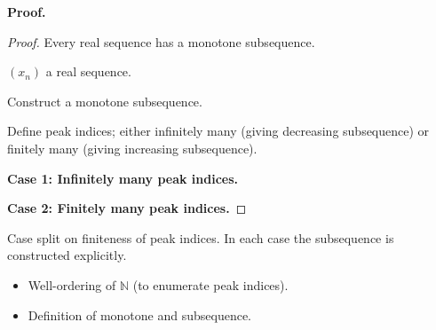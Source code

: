 \noindent
\textbf{Proof.}
\begin{proof}
\Claim Every real sequence has a monotone subsequence.

\Given $(x_n)$ a real sequence.

\Goal Construct a monotone subsequence.

\Strategy Define peak indices; either infinitely many (giving decreasing
subsequence) or finitely many (giving increasing subsequence).

\medskip


\textbf{Case 1: Infinitely many peak indices.}

\medskip
\textbf{Case 2: Finitely many peak indices.}

\end{proof}

\begin{remark*}
Case split on finiteness of peak indices. In each case the subsequence
is constructed explicitly.
\end{remark*}

\begin{remark*}[Dependencies]
\begin{itemize}
  \item Well-ordering of $\mathbb{N}$ (to enumerate peak indices).
  \item Definition of monotone and subsequence.
\end{itemize}
\end{remark*}
